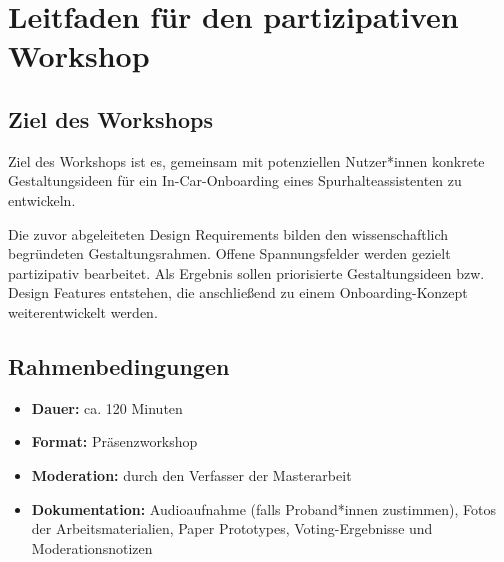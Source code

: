 \clearpage

\section{Leitfaden für den partizipativen Workshop}
\label{sec:workshopleitfaden}

\subsection{Ziel des Workshops}
\label{subsec:workshop-ziel}

Ziel des Workshops ist es, gemeinsam mit potenziellen Nutzer*innen konkrete Gestaltungsideen für ein In-Car-Onboarding eines Spurhalteassistenten zu entwickeln.

Die zuvor abgeleiteten Design Requirements bilden den wissenschaftlich begründeten Gestaltungsrahmen. Offene Spannungsfelder werden gezielt partizipativ bearbeitet. Als Ergebnis sollen priorisierte Gestaltungsideen bzw. Design Features entstehen, die anschließend zu einem Onboarding-Konzept weiterentwickelt werden.



\subsection{Rahmenbedingungen}
\label{subsec:workshop-rahmenbedingungen}

\begin{itemize}
    \item \textbf{Dauer:} ca. 120 Minuten
    \item \textbf{Format:} Präsenzworkshop
    \item \textbf{Moderation:} durch den Verfasser der Masterarbeit
    \item \textbf{Dokumentation:} Audioaufnahme (falls Proband*innen zustimmen), Fotos der
    Arbeitsmaterialien, Paper Prototypes, Voting-Ergebnisse und
    Moderationsnotizen
\end{itemize}



